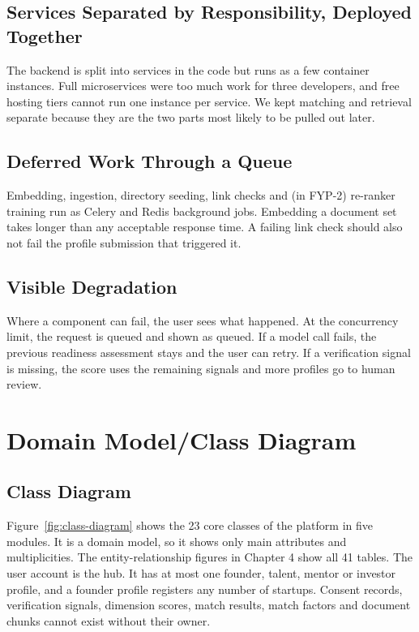 \documentclass{FastFyp}
\begin{document}
\subsection{Services Separated by Responsibility, Deployed Together}
The backend is split into services in the code but runs as a few container instances. Full microservices were too much work for three developers, and free hosting tiers cannot run one instance per service. We kept matching and retrieval separate because they are the two parts most likely to be pulled out later.

\subsection{Deferred Work Through a Queue}
Embedding, ingestion, directory seeding, link checks and (in FYP-2) re-ranker training run as Celery and Redis background jobs. Embedding a document set takes longer than any acceptable response time. A failing link check should also not fail the profile submission that triggered it.

\subsection{Visible Degradation}
Where a component can fail, the user sees what happened. At the concurrency limit, the request is queued and shown as queued. If a model call fails, the previous readiness assessment stays and the user can retry. If a verification signal is missing, the score uses the remaining signals and more profiles go to human review.

\section{Domain Model/Class Diagram}
\label{sec:domain}

\subsection{Class Diagram}
Figure~\ref{fig:class-diagram} shows the 23 core classes of the platform in five modules. It is a domain model, so it shows only main attributes and multiplicities. The entity-relationship figures in Chapter 4 show all 41 tables. The user account is the hub. It has at most one founder, talent, mentor or investor profile, and a founder profile registers any number of startups. Consent records, verification signals, dimension scores, match results, match factors and document chunks cannot exist without their owner.
\end{document}
